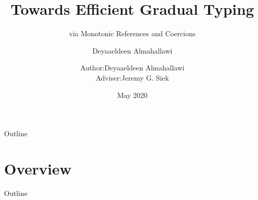 \documentclass[12pt,dvipsnames]{beamer}
\title %
{Towards Efficient Gradual Typing}
\subtitle{via Monotonic References and Coercions}
\author[Almahallawi] %
{Deyaaeldeen Almahallawi}
\institute[IU] %
{
  \inst{}%
  Doctor of Philosophy\\
  Luddy School of Informatics, Computing, and Engineering\\
  Indiana University Bloomington
}
\date[May 2020] %
{May 2020}
\begin{document}
\author[Almahallawi]{\begin{tabular}{r@{ }l} 
Author:      & Deyaaeldeen Almahallawi \\[1ex] 
Adviser: & Jeremy G. Siek
\end{tabular}}
\begin{frame}
\maketitle
\end{frame}

\begin{frame}{Outline}
\tableofcontents
\end{frame}

\section{Overview}

\begin{frame}{Outline}
  \tableofcontents[currentsection]
\end{frame}

\end{document}
